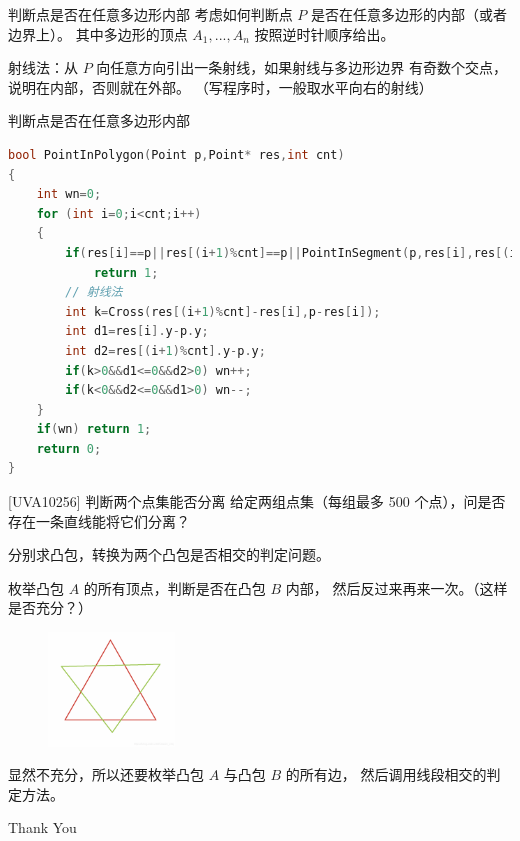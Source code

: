 \documentclass{beamer}
\begin{document}
\begin{frame}{判断点是否在任意多边形内部}
    \small
    考虑如何判断点 $P$ 是否在任意多边形的内部（或者边界上）。
    其中多边形的顶点 $A_1,...,A_n$ 按照逆时针顺序给出。

    \vspace{1em}\pause
    射线法：从 $P$ 向任意方向引出一条射线，如果射线与多边形边界
    有奇数个交点，说明在内部，否则就在外部。
    （写程序时，一般取水平向右的射线）
\end{frame}

\begin{frame}[fragile]{判断点是否在任意多边形内部}
    \small
    \begin{lstlisting}[language=c++]
bool PointInPolygon(Point p,Point* res,int cnt)
{
    int wn=0;
    for (int i=0;i<cnt;i++)
    {
        if(res[i]==p||res[(i+1)%cnt]==p||PointInSegment(p,res[i],res[(i+1)%cnt]))
            return 1;
        // 射线法
        int k=Cross(res[(i+1)%cnt]-res[i],p-res[i]);
        int d1=res[i].y-p.y;
        int d2=res[(i+1)%cnt].y-p.y;
        if(k>0&&d1<=0&&d2>0) wn++;
        if(k<0&&d2<=0&&d1>0) wn--;
    }
    if(wn) return 1;
    return 0;
}
    \end{lstlisting}
\end{frame}

\begin{frame}{[UVA10256] 判断两个点集能否分离}
    \small
    给定两组点集（每组最多 500 个点），问是否存在一条直线能将它们分离？

    \vspace{1em}\pause
    分别求凸包，转换为两个凸包是否相交的判定问题。

    \vspace{1em}\pause
    枚举凸包 $A$ 的所有顶点，判断是否在凸包 $B$ 内部，
    然后反过来再来一次。（这样是否充分？）

    \pause
    \begin{figure}[H]
        \centering
        \includegraphics[width=0.3\textwidth]{pic/convexInsect.png}
    \end{figure}

    显然不充分，所以还要枚举凸包 $A$ 与凸包 $B$ 的所有边，
    然后调用线段相交的判定方法。
\end{frame}

\begin{frame}
    \begin{center}
        {\Huge\calligra Thank You}
    \end{center}
\end{frame}
\end{document}
